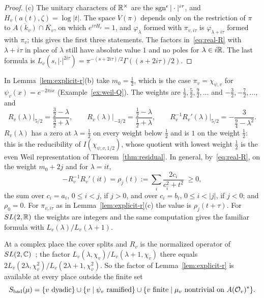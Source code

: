 \begin{proof}
(c) The unitary characters of $\mathbb{R}^\times$ are the
$\operatorname{sgn}^\epsilon|\cdot|^{i\tau}$, and $H_v(a(t),\zeta)=\log|t|$. The
space $V(\pi)$ depends only on the restriction of $\pi$ to
$\overline{A(k_v)}\cap\overline{K_v}$, on which $e^{i\tau H_v}=1$, and
$\varphi_\lambda$ formed with $\pi_{v,i\tau}$ is $\varphi_{\lambda+i\tau}$
formed with $\pi_v$; this gives the first three statements. The factors
in~\eqref{eq:real-R} with $\lambda+i\tau$ in place of $\lambda$ still have
absolute value $1$ and no poles for $\lambda\in i\mathbb{R}$. The last formula is
$L_v(s,|\cdot|^{2i\tau})=\pi^{-(s+2i\tau)/2}\Gamma((s+2i\tau)/2)$.
\end{proof}

\begin{example}\label{ex:real-R}
In Lemma~\ref{lem:explicit-r}(b) take $m_0=\frac12$, which is the case
$\pi_v=\chi_{\psi,v}$ for $\psi_v(x)=e^{-2\pi ix}$
(Example~\ref{ex:weil-Q}). The weights are $\frac12,\frac52,\frac92,\dots$
and $-\frac32,-\frac72,\dots$, and
\[
R_v(\lambda)\big|_{5/2}=\frac{\frac32-\lambda}{\frac32+\lambda},\qquad
R_v(\lambda)\big|_{-3/2}=\frac{\frac12-\lambda}{\frac12+\lambda},\qquad
R_v^{-1}R_v'(\lambda)\big|_{5/2}=-\frac{3}{\frac94-\lambda^2}.
\]
$R_v(\lambda)$ has a zero at $\lambda=\frac12$ on every weight below
$\frac12$ and is $1$ on the weight $\frac12$: this is the reducibility of
$I(\chi_{\psi,v,1/2})$, whose quotient with lowest weight $\frac12$ is
the even Weil representation of Theorem~\ref{thm:residual}. In
general, by~\eqref{eq:real-R}, on the weight $m_0+2j$ and for $\lambda=it$,
\begin{equation}\label{eq:rho-m}
-R_v^{-1}R_v'(it)=\rho_j(t):=\sum_i\frac{2c_i}{c_i^2+t^2}\;\ge0,
\end{equation}
the sum over $c_i=a_i$, $0\le i<j$, if $j>0$, and over $c_i=b_i$,
$0\le i<|j|$, if $j<0$; and $\rho_0=0$. For $\pi_{v,i\tau}$ as in
Lemma~\ref{lem:explicit-r}(c) the value is $\rho_j(t+\tau)$. For $SL(2,\mathbb{R})$ the weights are
integers and the same computation gives the familiar formula with
$L_v(\lambda)/L_v(\lambda+1)$.
\end{example}

At a complex place the cover splits and $R_v$ is the normalized operator
of $SL(2,\mathbb{C})$~\cite{Ar89}; the factor
$L_v(\lambda,\chi_v)/L_v(\lambda+1,\chi_v)$ there equals $2L_v(2\lambda,
\chi_v^2)/L_v(2\lambda+1,\chi_v^2)$. So the factor of
Lemma~\ref{lem:explicit-r} is available at every place outside the finite
set
\[
S_{\mathrm{bad}}(\mu)=\{v\text{ dyadic}\}\cup\{v\mid\psi_v\text{ ramified}\}
\cup\{v\text{ finite}\mid\mu_v\text{ nontrivial on }A(\mathcal{O}_v)^*\}.
\]

